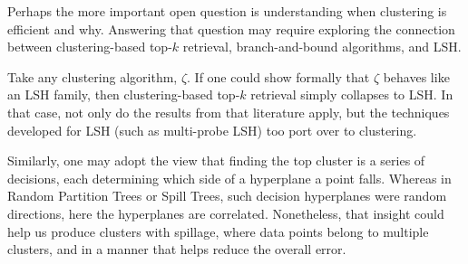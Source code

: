 \bigskip

Perhaps the more important open question is understanding when clustering
is efficient and why. Answering that question may require exploring the connection
between clustering-based top-$k$ retrieval, branch-and-bound algorithms, and LSH.

Take any clustering algorithm, $\zeta$. If one could show formally
that $\zeta$ behaves like an LSH family, then clustering-based top-$k$ retrieval
simply collapses to LSH. In that case, not only do the results from that literature
apply, but the techniques developed for LSH (such as multi-probe LSH) too
port over to clustering.

Similarly, one may adopt the view that finding the top cluster is a series
of decisions, each determining which side of a hyperplane a point falls.
Whereas in Random Partition Trees or Spill Trees, such decision hyperplanes were
random directions, here the hyperplanes are correlated.
Nonetheless, that insight could help us produce clusters with spillage, where
data points belong to multiple clusters, and in a manner that helps reduce
the overall error.



